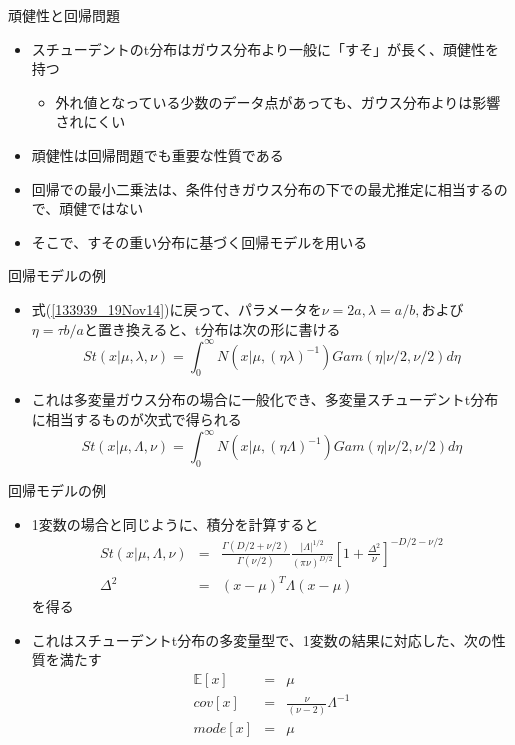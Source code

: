 \begin{frame}{頑健性と回帰問題}
 \begin{itemize}
  \item スチューデントのt分布はガウス分布より一般に「すそ」が長く、\alert{頑健性}を持つ
        \begin{itemize}
         \item 外れ値となっている少数のデータ点があっても、ガウス分布よりは影響されにくい
        \end{itemize}
  \item 頑健性は回帰問題でも重要な性質である
  \item 回帰での最小二乗法は、条件付きガウス分布の下での最尤推定に相当するので、頑健ではない
  \item そこで、すその重い分布に基づく回帰モデルを用いる
 \end{itemize}
\end{frame}

\begin{frame}{回帰モデルの例}
 \begin{itemize}
  \item 式(\ref{133939_19Nov14})に戻って、パラメータを$\nu=2a,\lambda=a/b,$および$\eta=\tau b/a$と置き換えると、t分布は次の形に書ける
        \begin{equation}
         St(x|\mu,\lambda,\nu) = \int_{0}^{\infty}N(x|\mu, (\eta\lambda)^{-1})Gam(\eta|\nu/2,\nu/2)d\eta
        \end{equation}
  \item これは多変量ガウス分布の場合に一般化でき、多変量スチューデントt分布に相当するものが次式で得られる
        \begin{equation}
         St(x|\mu,\Lambda,\nu) = \int_{0}^{\infty}N(x|\mu, (\eta\Lambda)^{-1})Gam(\eta|\nu/2,\nu/2)d\eta
        \end{equation}
 \end{itemize}
\end{frame}

\begin{frame}{回帰モデルの例}
 \begin{itemize}
  \item 1変数の場合と同じように、積分を計算すると
        \begin{eqnarray}
         St(x|\mu,\Lambda,\nu) &=& \frac{\Gamma(D/2+\nu/2)}{\Gamma(\nu/2)}\frac{|\Lambda|^{1/2}}{(\pi\nu)^{D/2}}\left[1+\frac{\Delta^2}{\nu}\right]^{-D/2-\nu/2} \\
         \Delta^2&= & (x-\mu)^T\Lambda(x-\mu)
        \end{eqnarray}
        を得る
  \item これはスチューデントt分布の多変量型で、1変数の結果に対応した、次の性質を満たす
        \begin{eqnarray}
         \mathbb{E}[x]&=&\mu\\
         cov[x]&=&\frac{\nu}{(\nu-2)}\Lambda^{-1}\\
         mode[x]& =& \mu
        \end{eqnarray}
 \end{itemize}
\end{frame}
